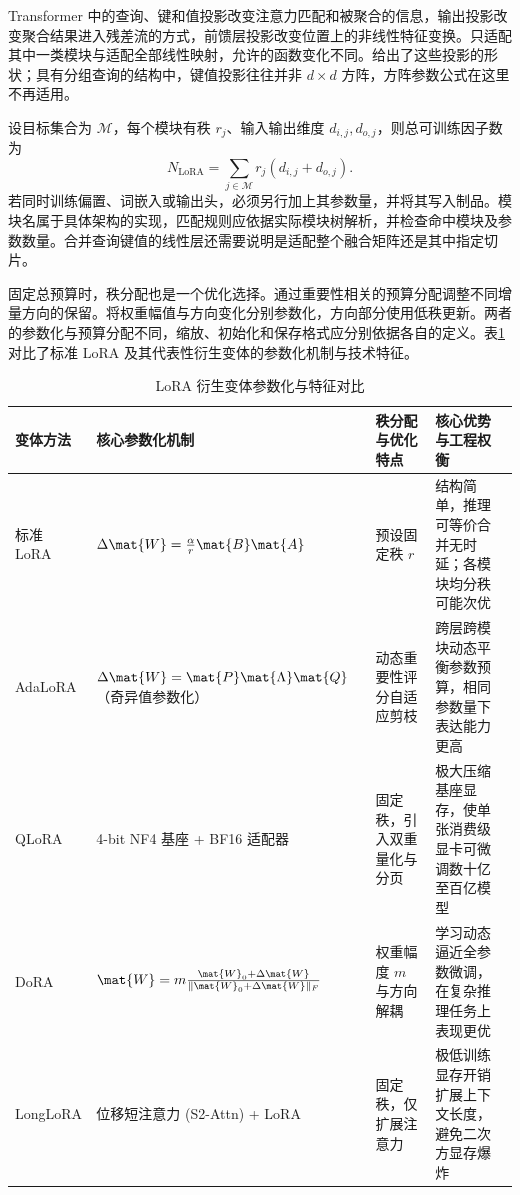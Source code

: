 \documentclass[../textbook.tex]{subfiles}
\begin{document}
Transformer 中的查询、键和值投影改变注意力匹配和被聚合的信息，输出投影改变聚合结果进入残差流的方式，前馈层投影改变位置上的非线性特征变换。只适配其中一类模块与适配全部线性映射，允许的函数变化不同。给出了这些投影的形状；具有分组查询的结构中，键值投影往往并非 $d\times d$ 方阵，方阵参数公式在这里不再适用。

设目标集合为 $\mathcal M$，每个模块有秩 $r_j$、输入输出维度 $d_{i,j},d_{o,j}$，则总可训练因子数为
\begin{equation}
N_{\mathrm{LoRA}}=\sum_{j\in\mathcal M}r_j(d_{i,j}+d_{o,j}).
\end{equation}
若同时训练偏置、词嵌入或输出头，必须另行加上其参数量，并将其写入制品。模块名属于具体架构的实现，匹配规则应依据实际模块树解析，并检查命中模块及参数数量。合并查询键值的线性层还需要说明是适配整个融合矩阵还是其中指定切片。

固定总预算时，秩分配也是一个优化选择。通过重要性相关的预算分配调整不同增量方向的保留\cite{zhang2023adalora}。将权重幅值与方向变化分别参数化，方向部分使用低秩更新\cite{liu2024dora}。两者的参数化与预算分配不同，缩放、初始化和保存格式应分别依据各自的定义。表\ref{tab:lora-variants}对比了标准 LoRA 及其代表性衍生变体的参数化机制与技术特征。

\begin{table}[htbp]
\centering
\caption{LoRA 衍生变体参数化与特征对比}
\label{tab:lora-variants}
\begin{tabularx}{\linewidth}{lp{32mm}p{30mm}X}
\toprule
变体方法 & 核心参数化机制 & 秩分配与优化特点 & 核心优势与工程权衡 \\
\midrule
标准 LoRA & $\Delta \mat{W} = \frac{\alpha}{r}\mat{B}\mat{A}$ & 预设固定秩 $r$ & 结构简单，推理可等价合并无时延；各模块均分秩可能次优 \\
AdaLoRA & $\Delta \mat{W} = \mat{P}\mat{\Lambda}\mat{Q}$（奇异值参数化） & 动态重要性评分自适应剪枝 & 跨层跨模块动态平衡参数预算，相同参数量下表达能力更高 \\
QLoRA & 4-bit NF4 基座 + BF16 适配器 & 固定秩，引入双重量化与分页 & 极大压缩基座显存，使单张消费级显卡可微调数十亿至百亿模型 \\
DoRA & $\mat{W} = m \frac{\mat{W}_0 + \Delta \mat{W}}{\|\mat{W}_0 + \Delta \mat{W}\|_F}$ & 权重幅度 $m$ 与方向解耦 & 学习动态逼近全参数微调，在复杂推理任务上表现更优 \\
LongLoRA & 位移短注意力 (S2-Attn) + LoRA & 固定秩，仅扩展注意力 & 极低训练显存开销扩展上下文长度，避免二次方显存爆炸 \\
\bottomrule
\end{tabularx}
\end{table}
\end{document}
